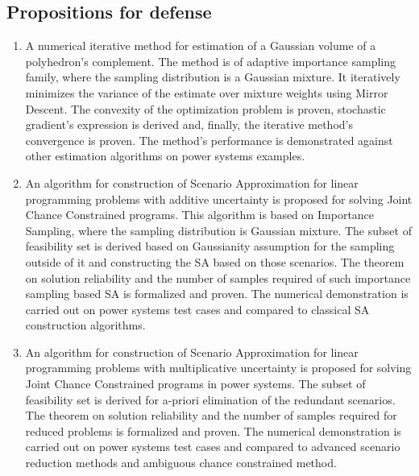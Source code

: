 \subsection*{Propositions for defense}

\begin{enumerate}

    \item A numerical iterative method for estimation of a Gaussian volume of a polyhedron's complement. The method is of adaptive importance sampling family, where the sampling distribution is a Gaussian mixture. It iteratively minimizes the variance of the estimate over mixture weights using Mirror Descent. The convexity of the optimization problem is proven, stochastic gradient's expression is derived and, finally, the iterative method's convergence is proven. The method's performance is demonstrated against other estimation algorithms on power systems examples.
    \item An algorithm for construction of Scenario Approximation for linear programming problems with additive uncertainty is proposed for solving Joint Chance Constrained programs. This algorithm is based on Importance Sampling, where the sampling distribution is Gaussian mixture. The subset of feasibility set is derived based on Gaussianity assumption for the sampling outside of it and constructing the SA based on those scenarios. The theorem on solution reliability and the number of samples required of such importance sampling based SA is formalized and proven. The numerical demonstration is carried out on power systems test cases and compared to classical SA construction algorithms.
    \item An algorithm for construction of Scenario Approximation for linear programming problems with multiplicative uncertainty is proposed for solving Joint Chance Constrained programs in power systems. The subset of feasibility set is derived for a-priori elimination of the redundant scenarios. 
    The theorem on solution reliability and the number of samples required for reduced problems is formalized and proven. The numerical demonstration is carried out on power systems test cases and compared to advanced scenario reduction methods and ambiguous chance constrained method.
 
\end{enumerate}

